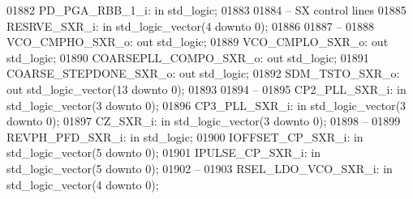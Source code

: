 \begin{DoxyCode}
01882     PD\_PGA\_RBB\_1\_i: \textcolor{keywordflow}{in} \textcolor{comment}{std\_logic};
01883     
01884 \textcolor{keyword}{    -- SX control lines }
01885     RESRVE\_SXR\_i:   \textcolor{keywordflow}{in} \textcolor{comment}{std\_logic\_vector}(\textcolor{vhdllogic}{}\textcolor{vhdllogic}{4} \textcolor{keywordflow}{downto} \textcolor{vhdllogic}{}\textcolor{vhdllogic}{0});
01886 
01887 \textcolor{keyword}{    --}
01888     VCO\_CMPHO\_SXR\_o:    \textcolor{keywordflow}{out} \textcolor{comment}{std\_logic};
01889     VCO\_CMPLO\_SXR\_o:    \textcolor{keywordflow}{out} \textcolor{comment}{std\_logic};
01890     COARSEPLL\_COMPO\_SXR\_o:  \textcolor{keywordflow}{out} \textcolor{comment}{std\_logic};
01891     COARSE\_STEPDONE\_SXR\_o:  \textcolor{keywordflow}{out} \textcolor{comment}{std\_logic};
01892     SDM\_TSTO\_SXR\_o: \textcolor{keywordflow}{out} \textcolor{comment}{std\_logic\_vector}(\textcolor{vhdllogic}{}\textcolor{vhdllogic}{13} \textcolor{keywordflow}{downto} \textcolor{vhdllogic}{}\textcolor{vhdllogic}{0});
01893 
01894 \textcolor{keyword}{    --}
01895     CP2\_PLL\_SXR\_i:  \textcolor{keywordflow}{in} \textcolor{comment}{std\_logic\_vector}(\textcolor{vhdllogic}{}\textcolor{vhdllogic}{3} \textcolor{keywordflow}{downto} \textcolor{vhdllogic}{}\textcolor{vhdllogic}{0});
01896     CP3\_PLL\_SXR\_i:  \textcolor{keywordflow}{in} \textcolor{comment}{std\_logic\_vector}(\textcolor{vhdllogic}{}\textcolor{vhdllogic}{3} \textcolor{keywordflow}{downto} \textcolor{vhdllogic}{}\textcolor{vhdllogic}{0});
01897     CZ\_SXR\_i:   \textcolor{keywordflow}{in} \textcolor{comment}{std\_logic\_vector}(\textcolor{vhdllogic}{}\textcolor{vhdllogic}{3} \textcolor{keywordflow}{downto} \textcolor{vhdllogic}{}\textcolor{vhdllogic}{0});
01898 \textcolor{keyword}{    --}
01899     REVPH\_PFD\_SXR\_i:    \textcolor{keywordflow}{in} \textcolor{comment}{std\_logic};
01900     IOFFSET\_CP\_SXR\_i:   \textcolor{keywordflow}{in} \textcolor{comment}{std\_logic\_vector}(\textcolor{vhdllogic}{}\textcolor{vhdllogic}{5} \textcolor{keywordflow}{downto} \textcolor{vhdllogic}{}\textcolor{vhdllogic}{0});
01901     IPULSE\_CP\_SXR\_i:    \textcolor{keywordflow}{in} \textcolor{comment}{std\_logic\_vector}(\textcolor{vhdllogic}{}\textcolor{vhdllogic}{5} \textcolor{keywordflow}{downto} \textcolor{vhdllogic}{}\textcolor{vhdllogic}{0});
01902 \textcolor{keyword}{    --}
01903     RSEL\_LDO\_VCO\_SXR\_i: \textcolor{keywordflow}{in} \textcolor{comment}{std\_logic\_vector}(\textcolor{vhdllogic}{}\textcolor{vhdllogic}{4} \textcolor{keywordflow}{downto} \textcolor{vhdllogic}{}\textcolor{vhdllogic}{0});

\end{DoxyCode}
